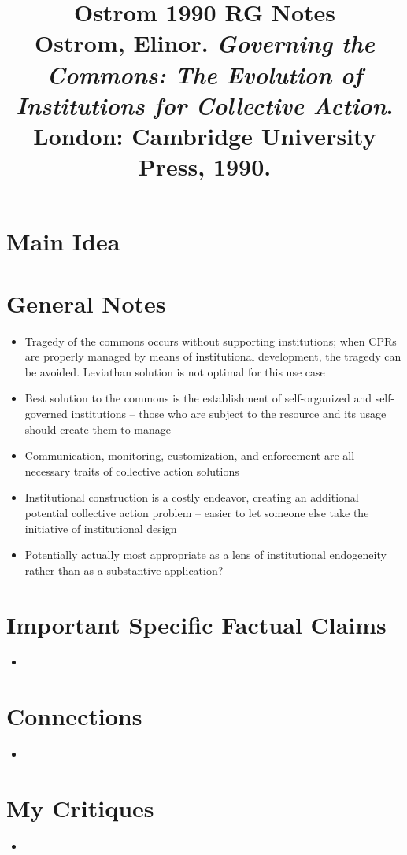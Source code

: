 \documentclass[12pt]{article}
\title{\textbf{Ostrom 1990 RG Notes}\\
\large Ostrom, Elinor. \textit{Governing the Commons: The Evolution of Institutions for Collective Action}.\\
London: Cambridge University Press, 1990.}
\author{}
\date{}
\begin{document}
\maketitle

\section{Main Idea}



\section{General Notes}

\begin{itemize}[leftmargin=*, itemsep=4pt]
    \item Tragedy of the commons occurs without supporting institutions; when CPRs are properly managed by means of institutional development, the tragedy can be avoided. Leviathan solution is not optimal for this use case
    \item Best solution to the commons is the establishment of self-organized and self-governed institutions -- those who are subject to the resource and its usage should create them to manage
    \item Communication, monitoring, customization, and enforcement are all necessary traits of collective action solutions
    \item Institutional construction is a costly endeavor, creating an additional potential collective action problem -- easier to let someone else take the initiative of institutional design
    \item Potentially actually most appropriate as a lens of institutional endogeneity rather than as a substantive application?
\end{itemize}


\section{Important Specific Factual Claims}

\begin{itemize}[leftmargin=*, itemsep=4pt]
    \item
\end{itemize}


\section{Connections}

\begin{itemize}
    \item
\end{itemize}


\section{My Critiques}

\begin{itemize}
    \item
\end{itemize}
\end{document}
